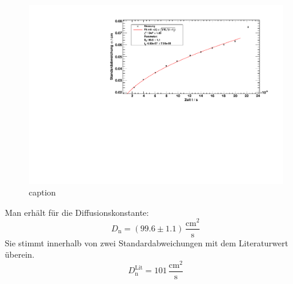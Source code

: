 \begin{figure}[H]
\begin{center}
  \includegraphics[width=\textwidth]{../img/part2/dist_fitSigma.pdf}
  \caption{caption}
  \label{img:dist:fitsigma}
\end{center}
\end{figure}
Man erhält für die Diffusionskonstante:
\begin{equation}
  D_\text{n} = (99.6 \pm 1.1)\,\frac{\text{cm}^2}{\text{s}}
\end{equation}
Sie stimmt innerhalb von zwei Standardabweichungen mit dem Literaturwert überein. 
\begin{equation}
  D_\text{n}^{\text{Lit}} = 101\,\frac{\text{cm}^2}{\text{s}} 
\end{equation}

